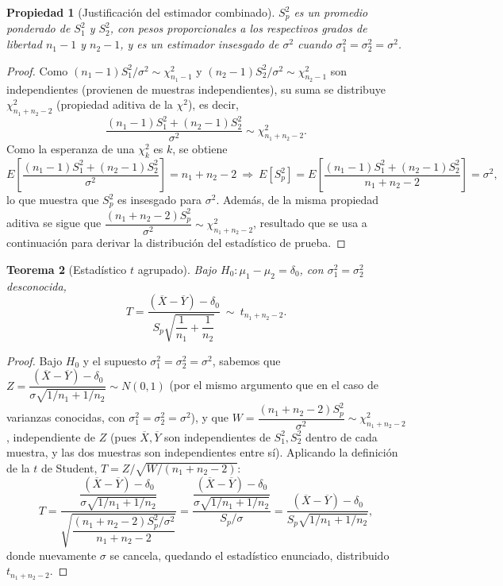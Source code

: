 \documentclass[11pt,a4paper]{article}
\theoremstyle{plain}
\newtheorem{teorema}{Teorema}[section]
\newtheorem{propiedad}[teorema]{Propiedad}
\theoremstyle{definition}
\theoremstyle{remark}
\begin{document}
\begin{propiedad}[Justificación del estimador combinado]
$S_p^2$ es un promedio ponderado de $S_1^2$ y $S_2^2$, con pesos proporcionales a los respectivos grados de libertad $n_1-1$ y $n_2-1$, y es un estimador insesgado de $\sigma^2$ cuando $\sigma_1^2=\sigma_2^2=\sigma^2$.
\end{propiedad}

\begin{proof}
Como $(n_1-1)S_1^2/\sigma^2\sim\chi^2_{n_1-1}$ y $(n_2-1)S_2^2/\sigma^2\sim\chi^2_{n_2-1}$ son independientes (provienen de muestras independientes), su suma se distribuye $\chi^2_{n_1+n_2-2}$ (propiedad aditiva de la $\chi^2$), es decir,
\[
\frac{(n_1-1)S_1^2+(n_2-1)S_2^2}{\sigma^2}\sim\chi^2_{n_1+n_2-2}.
\]
Como la esperanza de una $\chi^2_k$ es $k$, se obtiene
\[
E\!\left[\frac{(n_1-1)S_1^2+(n_2-1)S_2^2}{\sigma^2}\right]=n_1+n_2-2 \ \Longrightarrow\ E[S_p^2]=E\!\left[\frac{(n_1-1)S_1^2+(n_2-1)S_2^2}{n_1+n_2-2}\right]=\sigma^2,
\]
lo que muestra que $S_p^2$ es insesgado para $\sigma^2$. Además, de la misma propiedad aditiva se sigue que $\dfrac{(n_1+n_2-2)S_p^2}{\sigma^2}\sim\chi^2_{n_1+n_2-2}$, resultado que se usa a continuación para derivar la distribución del estadístico de prueba.
\end{proof}

\begin{teorema}[Estadístico $t$ agrupado]
Bajo $H_0:\mu_1-\mu_2=\delta_0$, con $\sigma_1^2=\sigma_2^2$ desconocida,
\[
T=\frac{(\overline X-\overline Y)-\delta_0}{S_p\sqrt{\dfrac{1}{n_1}+\dfrac{1}{n_2}}}\ \sim\ t_{n_1+n_2-2}.
\]
\end{teorema}

\begin{proof}
Bajo $H_0$ y el supuesto $\sigma_1^2=\sigma_2^2=\sigma^2$, sabemos que $Z=\dfrac{(\overline X-\overline Y)-\delta_0}{\sigma\sqrt{1/n_1+1/n_2}}\sim N(0,1)$ (por el mismo argumento que en el caso de varianzas conocidas, con $\sigma_1^2=\sigma_2^2=\sigma^2$), y que $W=\dfrac{(n_1+n_2-2)S_p^2}{\sigma^2}\sim\chi^2_{n_1+n_2-2}$, independiente de $Z$ (pues $\overline X, \overline Y$ son independientes de $S_1^2,S_2^2$ dentro de cada muestra, y las dos muestras son independientes entre sí). Aplicando la definición de la $t$ de Student, $T=Z/\sqrt{W/(n_1+n_2-2)}$:
\[
T=\frac{\dfrac{(\overline X-\overline Y)-\delta_0}{\sigma\sqrt{1/n_1+1/n_2}}}{\sqrt{\dfrac{(n_1+n_2-2)S_p^2/\sigma^2}{n_1+n_2-2}}}=\frac{\dfrac{(\overline X-\overline Y)-\delta_0}{\sigma\sqrt{1/n_1+1/n_2}}}{S_p/\sigma}=\frac{(\overline X-\overline Y)-\delta_0}{S_p\sqrt{1/n_1+1/n_2}},
\]
donde nuevamente $\sigma$ se cancela, quedando el estadístico enunciado, distribuido $t_{n_1+n_2-2}$.
\end{proof}
\end{document}
